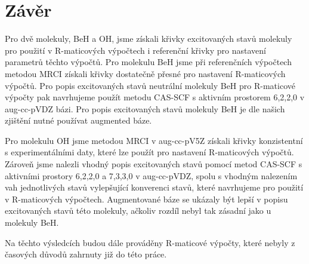 \chapter*{Závěr}
Pro dvě molekuly, BeH a OH, jsme získali křivky excitovaných stavů molekuly pro použití v 
R-maticových výpočtech i referenční křivky pro nastavení parametrů těchto výpočtů.
Pro molekulu BeH jsme při referenčních výpočtech metodou MRCI získali křivky dostatečně 
přesné pro nastavení R-maticových výpočtů. Pro popis excitovaných stavů neutrální 
molekuly BeH pro R-maticové výpočty pak navrhujeme použít metodu CAS-SCF s aktivním 
prostorem 6,2,2,0 v aug-cc-pVDZ bázi. Pro popis excitovaných stavů molekuly BeH je 
dle našich zjištění nutné používat augmented báze.

Pro molekulu OH jsme metodou MRCI v aug-cc-pV5Z získali křivky konzistentní s
experimentálními daty, které lze použít pro nastavení R-maticových výpočtů.
Zároveň jsme nalezli vhodný popis excitovaných stavů pomocí metod CAS-SCF s aktivními
prostory 6,2,2,0 a 7,3,3,0 v aug-cc-pVDZ, spolu s vhodným nalezením vah jednotlivých 
stavů vylepšující konverenci stavů, které navrhujeme pro použití v R-maticových 
výpočtech. Augmentované báze se ukázaly být lepší v popisu excitovaných stavů této 
molekuly, ačkoliv rozdíl nebyl tak zásadní jako u molekuly BeH.

Na těchto výsledcích budou dále prováděny R-maticové výpočty, které nebyly z časových důvodů zahrnuty již do této práce.